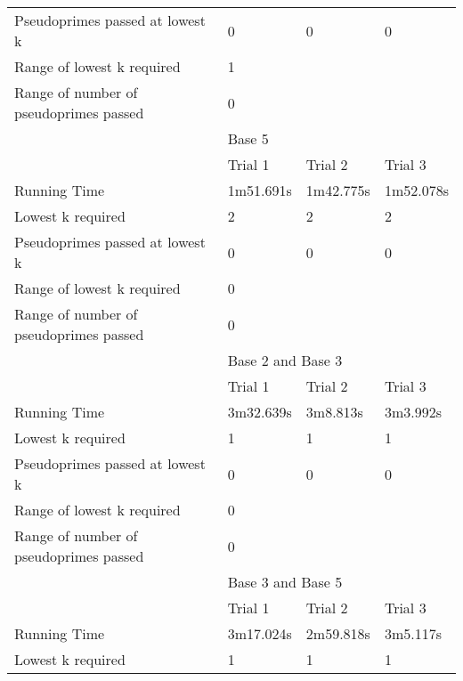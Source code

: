 \documentclass{article}
\begin{document}
\begin{appendices}
\begin{table}[h]
\begin{tabular}{@{}llll@{}}
Pseudoprimes passed at lowest k        & 0           & 0          & 0          \\\cmidrule(lr){2-4}
Range of lowest k required             & \multicolumn{3}{l}{1}                 \\
Range of number of pseudoprimes passed & \multicolumn{3}{l}{0}                 \\\midrule
                                       & \multicolumn{3}{l}{Base 5}            \\\midrule
                                       & Trial 1     & Trial 2    & Trial 3    \\
Running Time                           & 1m51.691s   & 1m42.775s  & 1m52.078s  \\
Lowest k required                      & 2           & 2          & 2          \\
Pseudoprimes passed at lowest k        & 0           & 0          & 0          \\\cmidrule(lr){2-4}
Range of lowest k required             & \multicolumn{3}{l}{0}                 \\
Range of number of pseudoprimes passed & \multicolumn{3}{l}{0}                 \\\midrule
                                       & \multicolumn{3}{l}{Base 2 and Base 3} \\\midrule
                                       & Trial 1     & Trial 2    & Trial 3    \\
Running Time                           & 3m32.639s   & 3m8.813s   & 3m3.992s   \\
Lowest k required                      & 1           & 1          & 1          \\
Pseudoprimes passed at lowest k        & 0           & 0          & 0          \\\cmidrule(lr){2-4}
Range of lowest k required             & \multicolumn{3}{l}{0}                 \\
Range of number of pseudoprimes passed & \multicolumn{3}{l}{0}                 \\\midrule
                                       & \multicolumn{3}{l}{Base 3 and Base 5} \\\midrule
                                       & Trial 1     & Trial 2    & Trial 3    \\
Running Time                           & 3m17.024s   & 2m59.818s  & 3m5.117s   \\
Lowest k required                      & 1           & 1          & 1          \\

\end{tabular}
\end{table}
\end{appendices}
\end{document}
